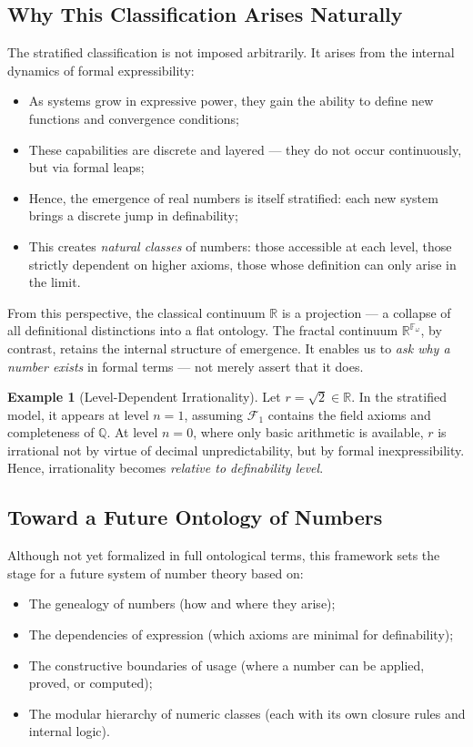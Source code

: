\documentclass[12pt]{article}
\theoremstyle{definition}
\newtheorem{example}{Example}[section]
\theoremstyle{plain}
\theoremstyle{remark}
\begin{document}
\subsection*{Why This Classification Arises Naturally}

The stratified classification is not imposed arbitrarily. It arises from the internal dynamics of formal expressibility:
\begin{itemize}
    \item As systems grow in expressive power, they gain the ability to define new functions and convergence conditions;
    \item These capabilities are discrete and layered — they do not occur continuously, but via formal leaps;
    \item Hence, the emergence of real numbers is itself stratified: each new system brings a discrete jump in definability;
    \item This creates \emph{natural classes} of numbers: those accessible at each level, those strictly dependent on higher axioms, those whose definition can only arise in the limit.
\end{itemize}

From this perspective, the classical continuum \( \mathbb{R} \) is a projection — a collapse of all definitional distinctions into a flat ontology. The fractal continuum \( \mathbb{R}^{\mathbb{F}_\omega} \), by contrast, retains the internal structure of emergence. It enables us to \emph{ask why a number exists} in formal terms — not merely assert that it does.

\begin{example}[Level-Dependent Irrationality]
Let \( r = \sqrt{2} \in \mathbb{R} \). In the stratified model, it appears at level \( n = 1 \), assuming \( \mathcal{F}_1 \) contains the field axioms and completeness of \( \mathbb{Q} \). At level \( n = 0 \), where only basic arithmetic is available, \( r \) is irrational not by virtue of decimal unpredictability, but by formal inexpressibility. Hence, irrationality becomes \emph{relative to definability level}.
\end{example}

\subsection*{Toward a Future Ontology of Numbers}

Although not yet formalized in full ontological terms, this framework sets the stage for a future system of number theory based on:
\begin{itemize}
    \item The genealogy of numbers (how and where they arise);
    \item The dependencies of expression (which axioms are minimal for definability);
    \item The constructive boundaries of usage (where a number can be applied, proved, or computed);
    \item The modular hierarchy of numeric classes (each with its own closure rules and internal logic).
\end{itemize}
\end{document}
